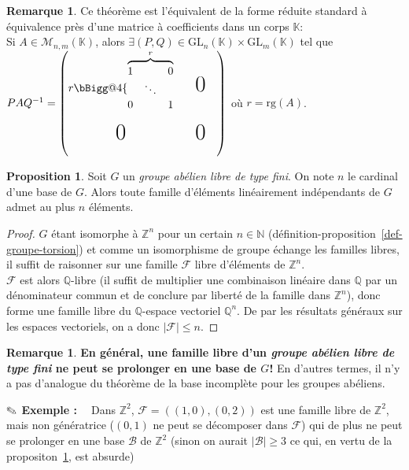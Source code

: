 \documentclass{report}
\makeatletter
\newcommand{\Q}{\mathbb{Q}}
\newcommand{\Z}{\mathbb{Z}}
\newcommand{\K}{\mathbb{K}}
\newcommand{\N}{\mathbb{N}}
\newcommand{\rg}[1]{\mathrm{rg}(#1)}
\newcommand{\x}{\times}
\theoremstyle{definition}
\newtheorem{prop}[defi]{Proposition}
\newtheorem{rem}[defi]{Remarque}
\newcommand{\exem}{{\textbf{$\text{\ding{46}}$ Exemple : \ }}}
\newcommand{\warning}[1]{{\bf{\fontencoding{U}\fontfamily{futs}\selectfont\char 66\relax} #1}}
\newcommand{\biggg}{\bBigg@{4}}
\makeatother
\begin{document}
\begin{rem}
Ce théorème est l'équivalent de la forme réduite standard à équivalence près d'une matrice à coefficients dans un corps $\K$:\\
Si $A\in \mathcal{M}_{n,m}(\K)$, alors $\exists (P,Q)\in\textrm{GL}_n(\K)\x\textrm{GL}_m(\K)$ tel que $PAQ^{-1}=
\begin{pmatrix}
	r\biggg\{\overbrace{
		\begin{matrix}1&&0\\
		&\ddots\\
		0&&1\end{matrix}
	}^{r} && \text{\huge0}&\\
	&\\
    \text{\huge0} && \text{\huge0}\\
	&
\end{pmatrix}$ o\`u $r=\rg{A}$.
\end{rem}

\begin{prop}\label{card-fam-libre}
Soit $G$ un \textit{groupe abélien libre de type fini}. On note $n$ le cardinal d'une base de $G$. Alors toute famille d'éléments linéairement indépendants de $G$ admet au plus $n$ éléments.
\end{prop}

\begin{proof}$G$ étant isomorphe à $\Z^n$ pour un certain $n \in \N$ (d\'efinition-proposition~\ref{def-groupe-torsion}) et comme un isomorphisme de groupe échange
les familles libres, il suffit de raisonner sur une famille $\mathcal{F}$ libre d'éléments de $\Z^n$.\\
$\mathcal{F}$ est alors $\Q$-libre (il suffit de multiplier une combinaison linéaire dans $\Q$ par un dénominateur commun et de conclure par libert\'e de la famille dans $\Z^n$), donc forme une famille libre du $\Q$-espace vectoriel $\Q^n$. De par les r\'esultats g\'en\'eraux sur les espaces vectoriels, on a donc $\vert \mathcal{F} \vert \leqslant n$.
\end{proof}

\begin{rem}
\warning{En g\'en\'eral, une famille libre d'un \textit{groupe abélien libre de type fini} ne peut se prolonger en une base de $G$!}\smallbreak
En d'autres termes, il n'y a pas d'analogue du théorème de la base incomplète pour les groupes abéliens.
\end{rem}

\exem
Dans $\Z^2$, $\mathcal{F}=((1,0),(0,2))$ est une famille libre de $\Z^2$, mais non g\'en\'eratrice ($(0,1)$ ne peut se d\'ecomposer dans $\mathcal{F}$) qui de plus
ne peut se prolonger en une base $\mathcal{B}$ de $\Z^2$ (sinon on aurait $|\mathcal{B}|\geq 3$ ce qui, en vertu de la propositon~\ref{card-fam-libre}, est absurde)
\end{document}
